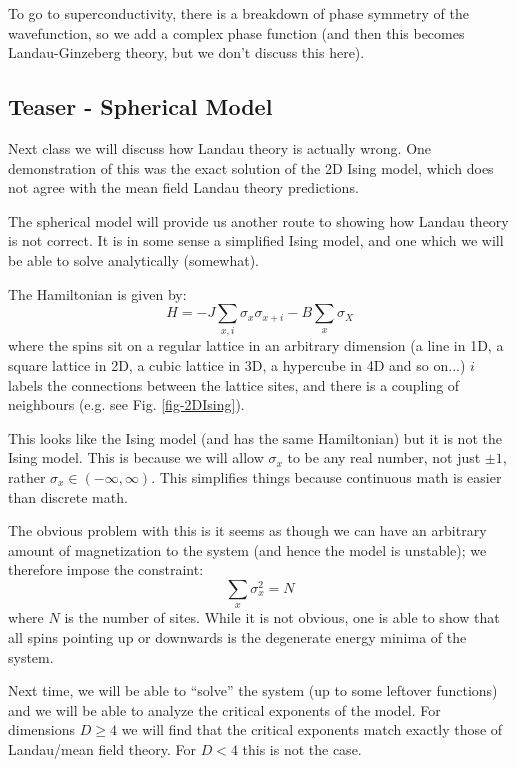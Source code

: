 To go to superconductivity, there is a breakdown of phase symmetry of the wavefunction, so we add a complex phase function (and then this becomes Landau-Ginzeberg theory, but we don't discuss this here).

\subsection{Teaser - Spherical Model}
Next class we will discuss how Landau theory is actually wrong. One demonstration of this was the exact solution of the 2D Ising model, which does not agree with the mean field Landau theory predictions. 

The spherical model will provide us another route to showing how Landau theory is not correct. It is in some sense a simplified Ising model, and one which we will be able to solve analytically (somewhat).

The Hamiltonian is given by:
\begin{equation}
    H = -J\sum_{x, i}\sigma_x \sigma_{x + i} - B \sum_x \sigma_X
\end{equation}
where the spins sit on a regular lattice in an arbitrary dimension (a line in 1D, a square lattice in 2D, a cubic lattice in 3D, a hypercube in 4D and so on...) $i$ labels the connections between the lattice sites, and there is a coupling of neighbours (e.g. see Fig. \ref{fig-2DIsing}).

This looks like the Ising model (and has the same Hamiltonian) but it is not the Ising model. This is because we will allow $\sigma_x$ to be any real number, not just $\pm 1$, rather $\sigma_x \in (-\infty, \infty)$. This simplifies things because continuous math is easier than discrete math.

The obvious problem with this is it seems as though we can have an arbitrary amount of magnetization to the system (and hence the model is unstable); we therefore impose the constraint:
\begin{equation}
    \sum_x \sigma_x^2 = N
\end{equation}
where $N$ is the number of sites. While it is not obvious, one is able to show that all spins pointing up or downwards is the degenerate energy minima of the system.

Next time, we will be able to ``solve'' the system (up to some leftover functions) and we will be able to analyze the critical exponents of the model. For dimensions $D \geq 4$ we will find that the critical exponents match exactly those of Landau/mean field theory. For $D < 4$ this is not the case. 